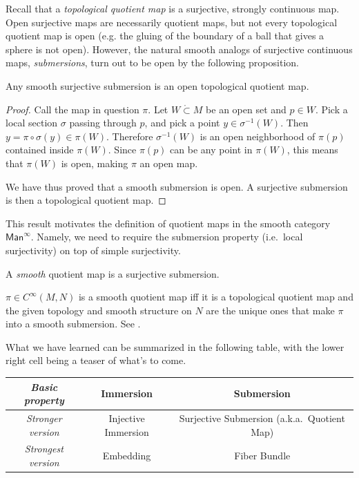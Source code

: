 \documentclass[english,letterpaper]{article}%
\numberwithin{equation}{section}
\numberwithin{figure}{section}
\numberwithin{table}{section}
\theoremstyle{definition}
\theoremstyle{definition}
\theoremstyle{definition}
\theoremstyle{plain}
\theoremstyle{plain}
\theoremstyle{plain}
\theoremstyle{plain}
\theoremstyle{remark}
\theoremstyle{remark}
\begin{document}
Recall that a \emph{topological quotient map} is a surjective, strongly continuous map. Open surjective maps are necessarily quotient maps, but not every topological quotient map is open (e.g. the gluing of the boundary of a ball that gives a sphere is not open). However, the natural smooth analogs of surjective continuous maps, \emph{submersions}, turn out to be open by the following proposition.

\begin{prop}
Any smooth surjective submersion is an open topological quotient map.
\end{prop}
\begin{proof}
Call the map in question $\pi$. Let $W\mathring{\subset} M$ be an open set and $p\in W$. Pick a local section $\sigma $ passing through $p$, and pick a point $y\in \sigma^{-1}(W)$. Then $y=\pi\circ\sigma(y)\in\pi(W)$. Therefore $\sigma^{-1}(W)$ is an open neighborhood of $\pi(p)$ contained inside $\pi(W)$. Since $\pi(p)$ can be any point in $\pi(W)$, this means that $\pi(W)$ is open, making $\pi$ an open map.

We have thus proved that a smooth submersion is open. A surjective submersion is then a topological quotient map.
\end{proof}

This result motivates the definition of quotient maps in the smooth category $\mathsf{Man}^\infty$. Namely, we need to require the submersion property (i.e.\ local surjectivity) on top of simple surjectivity.

\begin{defn}
A \emph{smooth} quotient map is a surjective submersion.
\end{defn}
\begin{rem}
$\pi\in C^\infty(M,N)$ is a smooth quotient map iff it is a topological quotient map and the given topology and smooth structure on $N$ are the unique ones that make $\pi$ into a smooth submersion. See \cite[Problem 4-7]{Lee}.
\end{rem}

What we have learned can be summarized in the following table, with the lower right cell being a teaser of what's to come.

\begin{center}
\begin{tabular}{|c|c|c|}
    \hline
    \emph{Basic property} & Immersion & Submersion  \\
    \hline
    \emph{Stronger version}  & Injective Immersion & Surjective Submersion (a.k.a.~Quotient Map) \\
    \hline
    \emph{Strongest version}  & Embedding & Fiber Bundle \\
    \hline
\end{tabular}
\end{center}
 
\end{document}
